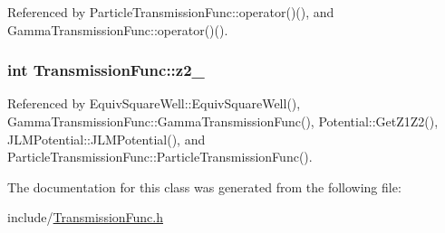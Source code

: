 Referenced by Particle\-Transmission\-Func\-::operator()(), and Gamma\-Transmission\-Func\-::operator()().

\hypertarget{classTransmissionFunc_ac0a75ed458ba6c9072c5e66a9f2e43fc}{
\subsubsection[{z2\-\_\-}]{\setlength{\rightskip}{0pt plus 5cm}int Transmission\-Func\-::z2\-\_\-\hspace{0.3cm}{\ttfamily [protected]}}}\label{classTransmissionFunc_ac0a75ed458ba6c9072c5e66a9f2e43fc}


Referenced by Equiv\-Square\-Well\-::\-Equiv\-Square\-Well(), Gamma\-Transmission\-Func\-::\-Gamma\-Transmission\-Func(), Potential\-::\-Get\-Z1\-Z2(), J\-L\-M\-Potential\-::\-J\-L\-M\-Potential(), and Particle\-Transmission\-Func\-::\-Particle\-Transmission\-Func().



The documentation for this class was generated from the following file\-:\begin{DoxyCompactItemize}
\item 
include/\hyperlink{TransmissionFunc_8h}{Transmission\-Func.\-h}\end{DoxyCompactItemize}
